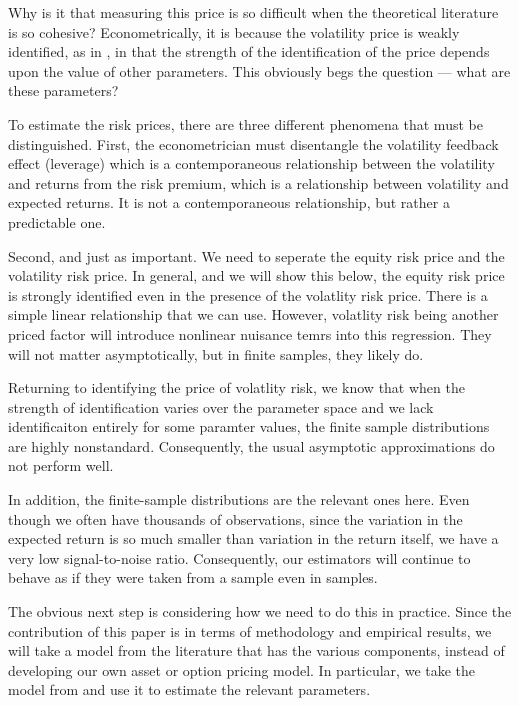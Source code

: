 \documentclass[11pt, letterpaper, twoside, final]{article}
\begin{document}
Why is it that measuring this price is so difficult when the theoretical literature is so cohesive?
Econometrically, it is because the volatility price is weakly identified, as in \textcite{andrews2012estimation},
in that the strength of the identification of the price depends upon the value of other parameters. 
This obviously begs the question --- what are these parameters? 

To estimate the risk prices, there are three different phenomena that must be distinguished.
First, the econometrician must disentangle the volatility feedback effect (leverage) which is a contemporaneous
relationship between the volatility and returns from the risk premium, which is a relationship between volatility
and expected returns. 
It is not a contemporaneous relationship, but rather a predictable one. 

Second, and just as important.
We need to seperate the equity risk price and the volatility risk price. 
In general, and we will show this below, the equity risk price is strongly identified even in the presence of the
volatlity risk price. 
There is a simple linear relationship that we can use.
However, volatlity risk being another priced factor will introduce nonlinear nuisance temrs into this regression. 
They will not matter asymptotically, but in finite samples, they likely do.

Returning to identifying the price of volatlity risk, we know that when the strength of identification varies over
the parameter space and we lack identificaiton entirely for some paramter values, the finite sample distributions
are highly nonstandard. 
Consequently, the usual asymptotic approximations do not perform well. 

In addition, the finite-sample distributions are the relevant ones here. 
Even though we often have thousands of observations, since the variation in the expected return is so much smaller
than variation in the return itself, we have a very low signal-to-noise ratio.
Consequently, our estimators will continue to behave as if they were taken from a  sample even in
 samples.

The obvious next step is considering how we need to do this in practice.
Since the contribution of this paper is in terms of methodology and empirical results, we will take a model from
the literature that has the various components, instead of developing our own asset or option pricing model.
In particular, we take the model from \textcite{khrapov2016affine} and use it to estimate the relevant parameters. 
\end{document}
